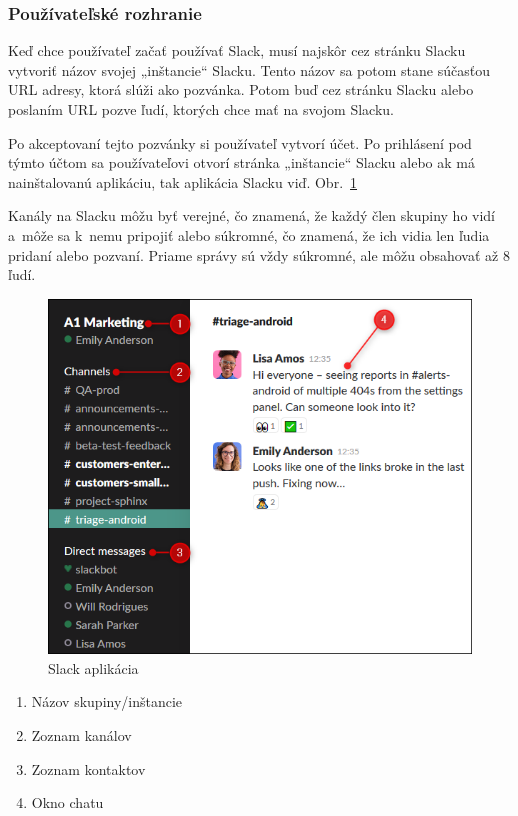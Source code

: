 \subsubsection{Používateľské rozhranie}
\indent Keď chce používateľ začať používať Slack, musí najskôr cez stránku Slacku vytvoriť názov svojej „inštancie“ Slacku. Tento názov sa potom stane súčasťou URL adresy, ktorá slúži ako pozvánka. Potom buď cez stránku Slacku alebo poslaním URL pozve ľudí, ktorých chce mať na svojom Slacku. 

\indent Po akceptovaní tejto pozvánky si používateľ vytvorí účet. Po prihlásení pod týmto účtom sa používateľovi otvorí stránka „inštancie“ Slacku alebo ak má nainštalovanú aplikáciu, tak aplikácia Slacku viď. Obr.~\ref{fig:img-slack-app}

\indent Kanály na Slacku môžu byť verejné, čo znamená, že každý člen skupiny ho vidí a môže sa k nemu pripojiť alebo súkromné, čo znamená, že ich vidia len ľudia pridaní alebo pozvaní. Priame správy sú vždy súkromné, ale môžu obsahovať až 8 ľudí.

\begin{figure}[H]
    \centering
    \includegraphics[scale=0.80]{img/obr1.png}
    \caption{Slack aplikácia}
    \label{fig:img-slack-app}
\end{figure}
\begin{enumerate}
    \centering
    \item Názov skupiny/inštancie
    \item Zoznam kanálov 
    \item Zoznam kontaktov
    \item Okno chatu
\end{enumerate}


